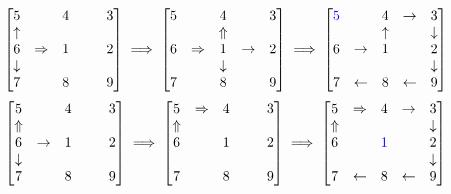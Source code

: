 \documentclass[11pt]{article}
\begin{document}
\[
\begin{bmatrix}
5 & & 4 &  \ \  & 3\\
\uparrow & & & & \\
6 & \Rightarrow & 1 & & 2\\
\downarrow & &  & & \\
7 & & 8 & & 9\\
\end{bmatrix} \implies
\begin{bmatrix}
5 & \ \ & 4 & & 3\\
 & & \Uparrow & & \\
6 & \Rightarrow & 1 & \rightarrow & 2\\
 & & \downarrow & &  \\
7 & & 8 &  & 9\\
\end{bmatrix} \implies
\begin{bmatrix}
\textcolor{blue}{5} & \ \ & 4 & \rightarrow & 3\\
 & & \uparrow & & \downarrow \\
6 & \rightarrow & 1 & & 2\\
 & &  & & \downarrow \\
7 & \leftarrow & 8 & \leftarrow & 9\\
\end{bmatrix}
\]
\[
\begin{bmatrix}
5 & & 4 &  \ \  & 3\\
\Uparrow & & & & \\
6 & \rightarrow & 1 & & 2\\
\downarrow & &  & & \\
7 & & 8 & & 9\\
\end{bmatrix} \implies
\begin{bmatrix}
5 & \Rightarrow & 4 &  \ \  & 3\\
\Uparrow & & & & \\
6 &  & 1 & & 2\\
 & &  & & \\
7 & & 8 & & 9\\
\end{bmatrix} \implies
\begin{bmatrix}
5 & \Rightarrow & 4 & \rightarrow & 3\\
\Uparrow & & & & \downarrow \\
6 & & \textcolor{blue}{1} & & 2\\
 & &  & & \downarrow \\
7 & \leftarrow & 8 & \leftarrow & 9\\
\end{bmatrix}
\]
\end{document}
